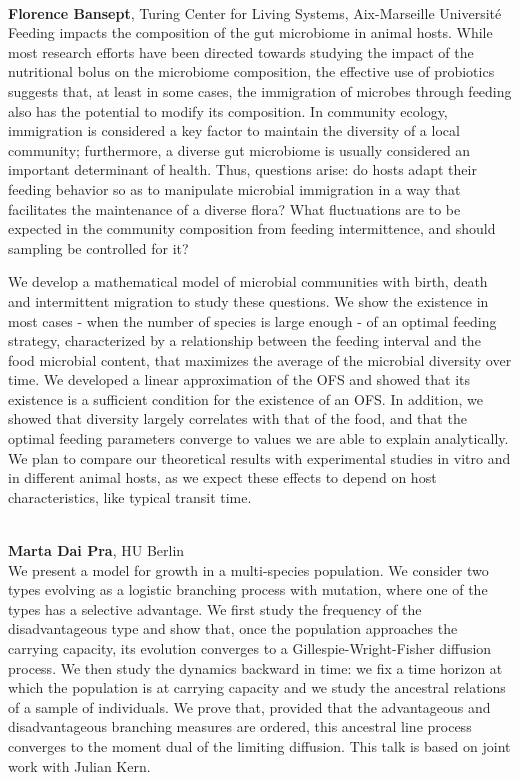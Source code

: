 \documentclass[12pt,a4paper]{article}
\begin{document}
\\[1ex]{ \large \textbf{ Florence Bansept}}, Turing Center for Living Systems, Aix-Marseille Université \\[2ex] Feeding impacts the composition of the gut microbiome in animal hosts. While most research efforts have been directed towards studying the impact of the nutritional bolus on the microbiome composition, the effective use of probiotics suggests that, at least in some cases, the immigration of microbes through feeding also has the potential to modify its composition. In community ecology, immigration is considered a key factor to maintain the diversity of a local community; furthermore, a diverse gut microbiome is usually considered an important determinant of health. Thus, questions arise: do hosts adapt their feeding behavior so as to manipulate microbial immigration in a way that facilitates the maintenance of a diverse flora? What fluctuations are to be expected in the community composition from feeding intermittence, and should sampling be controlled for it?  

 We develop a mathematical model of microbial communities with birth, death and intermittent migration to study these questions. We show the existence in most cases - when the number of species is large enough - of an optimal feeding strategy, characterized by a relationship between the feeding interval and the food microbial content, that maximizes the average of the microbial diversity over time. We developed a linear approximation of the OFS and showed that its existence is a sufficient condition for the existence of an OFS. In addition, we showed that diversity largely correlates with that of the food, and that the optimal feeding parameters converge to values we are able to explain analytically.  We plan to compare our theoretical results with experimental studies in vitro and in different animal hosts, as we expect these effects to depend on host characteristics, like typical transit time. 

\bigskip\bigskip

\\[1ex]{ \large \textbf{ Marta Dai Pra}}, HU Berlin \\[2ex] We present a model for growth in a multi-species population. We consider two types evolving as a logistic branching process with mutation, where one of the types has a selective advantage. We first study the frequency of the disadvantageous type and show that, once the population approaches the carrying capacity, its evolution converges to a Gillespie-Wright-Fisher diffusion process. We then study the dynamics backward in time: we fix a time horizon at which the population is at carrying capacity and we study the ancestral relations of a sample of individuals. We prove that, provided that the advantageous and disadvantageous branching measures are ordered, this ancestral line process converges to the moment dual of the limiting diffusion. This talk is based on joint work with Julian Kern. 
\end{document}
